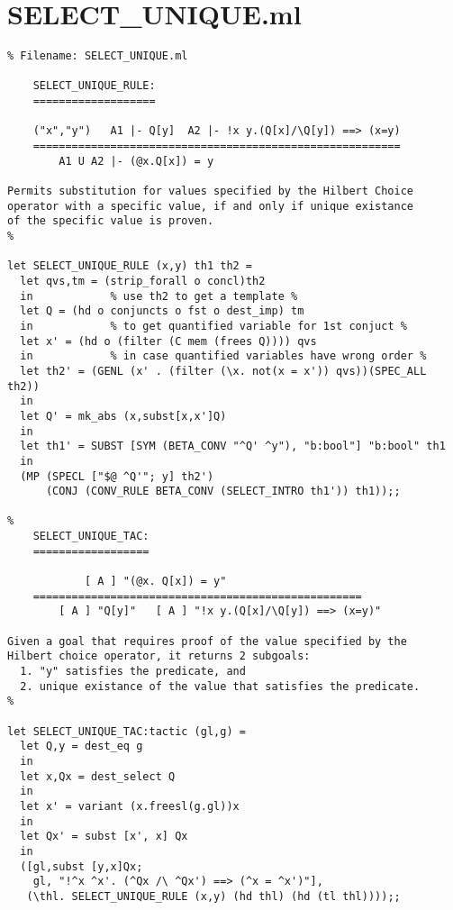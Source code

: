 \appendix

\section{SELECT\_UNIQUE.ml}\label{AppendixA}
\begin{verbatim}
% Filename: SELECT_UNIQUE.ml

	SELECT_UNIQUE_RULE:
	===================

	("x","y")   A1 |- Q[y]  A2 |- !x y.(Q[x]/\Q[y]) ==> (x=y)
	=========================================================
		A1 U A2 |- (@x.Q[x]) = y

Permits substitution for values specified by the Hilbert Choice
operator with a specific value, if and only if unique existance
of the specific value is proven.
%

let SELECT_UNIQUE_RULE (x,y) th1 th2 =
  let qvs,tm = (strip_forall o concl)th2
  in			% use th2 to get a template %
  let Q = (hd o conjuncts o fst o dest_imp) tm
  in			% to get quantified variable for 1st conjuct %
  let x' = (hd o (filter (C mem (frees Q)))) qvs
  in			% in case quantified variables have wrong order %
  let th2' = (GENL (x' . (filter (\x. not(x = x')) qvs))(SPEC_ALL th2))
  in
  let Q' = mk_abs (x,subst[x,x']Q)
  in
  let th1' = SUBST [SYM (BETA_CONV "^Q' ^y"), "b:bool"] "b:bool" th1
  in
  (MP (SPECL ["$@ ^Q'"; y] th2')
      (CONJ (CONV_RULE BETA_CONV (SELECT_INTRO th1')) th1));;

%
	SELECT_UNIQUE_TAC:
	==================

	        [ A ] "(@x. Q[x]) = y"
	===================================================
        [ A ] "Q[y]"   [ A ] "!x y.(Q[x]/\Q[y]) ==> (x=y)"

Given a goal that requires proof of the value specified by the 
Hilbert choice operator, it returns 2 subgoals:
  1. "y" satisfies the predicate, and
  2. unique existance of the value that satisfies the predicate.
%
	
let SELECT_UNIQUE_TAC:tactic (gl,g) =
  let Q,y = dest_eq g
  in
  let x,Qx = dest_select Q
  in
  let x' = variant (x.freesl(g.gl))x
  in
  let Qx' = subst [x', x] Qx
  in
  ([gl,subst [y,x]Qx;
    gl, "!^x ^x'. (^Qx /\ ^Qx') ==> (^x = ^x')"],
   (\thl. SELECT_UNIQUE_RULE (x,y) (hd thl) (hd (tl thl))));;
\end{verbatim}

\newpage


